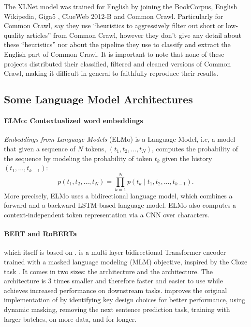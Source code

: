 The XLNet model was trained for English by joining the BookCorpus, English Wikipedia, Giga5 \citep{parker-etal-2011-english}, ClueWeb 2012-B \citep{callan-etal-2009-clueweb09} and Common Crawl. Particularly for Common Crawl, \citet{yang-etal-2019-xlnet} say they use ``heuristics to aggressively filter out short or low-quality articles'' from Common Crawl, however they don't give any detail about these ``heuristics'' nor about the pipeline they use to classify and extract the English part of Common Crawl. It is important to note that none of these projects distributed their classified, filtered and cleaned versions of Common Crawl, making it difficult in general to faithfully reproduce their results.

\subsection{Some Language Model Architectures}

\paragraph{ELMo: Contextualized word embeddings}
\emph{Embeddings from Language Models} (ELMo) \citep{peters-etal-2018-deep} is a Language Model, i.e, a model that given a sequence of $N$ tokens, $(t_1, t_2, ..., t_N)$, computes the probability of the sequence by modeling the probability of token $t_k$ given the history $(t_1, ..., t_{k-1})$:
\[
    p(t_1, t_2, \ldots, t_N) = \prod_{k=1}^N p({t_k} \mid t_1, t_2, \ldots, t_{k-1}).
\]
More precisely, ELMo uses a bidirectional language model, which combines a forward and a backward LSTM-based language model. ELMo also computes a context-independent token representation via a CNN over characters.

\paragraph{BERT and RoBERTa} \roberta \citep{liu-etal-2019-roberta} which itself is based on \bert \citep{devlin-etal-2019-bert}. \bert is a multi-layer bidirectional Transformer encoder trained with a masked language modeling (MLM) objective, inspired by the Cloze task \citep{taylor-1953-cloze}. It comes in two sizes: the \bertbase architecture and the \bertlarge architecture. The \bertbase architecture is 3 times smaller and therefore faster and easier to use while \bertlarge achieves increased performance on downstream tasks. \roberta improves the original implementation of \bert by identifying key design choices for better performance, using dynamic masking, removing the next sentence prediction task, training with larger batches, on more data, and for longer.

